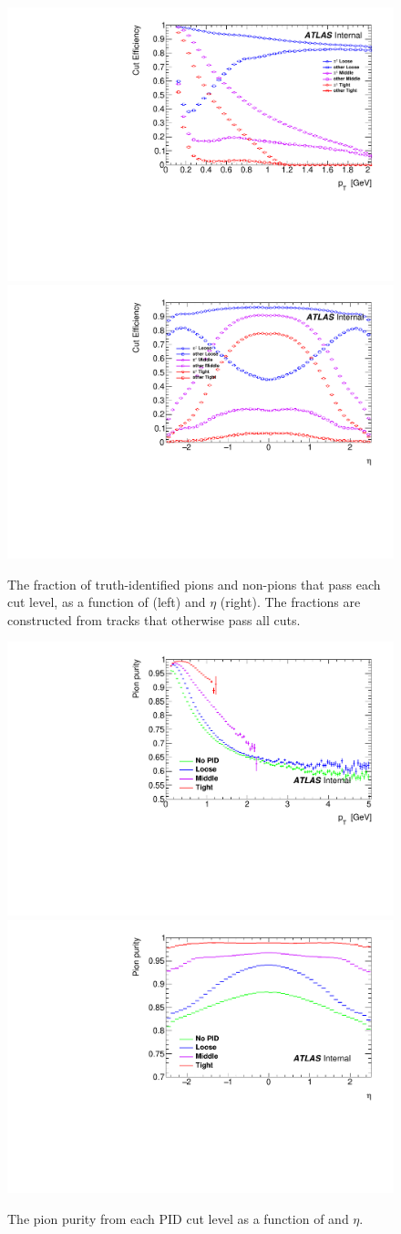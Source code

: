 \begin{figure}[t]
\includegraphics[width=.49\linewidth]{pid_eff_pt.pdf}
\includegraphics[width=.49\linewidth]{pid_eff_eta.pdf}\\
\caption{The fraction of truth-identified pions and non-pions that pass each \pid cut level, as a function of \pt (left) and $\eta$ (right). The fractions are constructed from tracks that otherwise pass all cuts.}
\label{fig:pid_eff}
\end{figure}

\begin{figure}[t]
\begin{minipage}[t]{1.0\textwidth}
\centering
\includegraphics[width=.49\linewidth]{pid_purity_pt.pdf}
\includegraphics[width=.49\linewidth]{pid_purity_eta.pdf}\\
\end{minipage}
\caption{The pion purity from each PID cut level as a function of \pt and $\eta$.}
\label{fig:pid_purity}
\end{figure}

